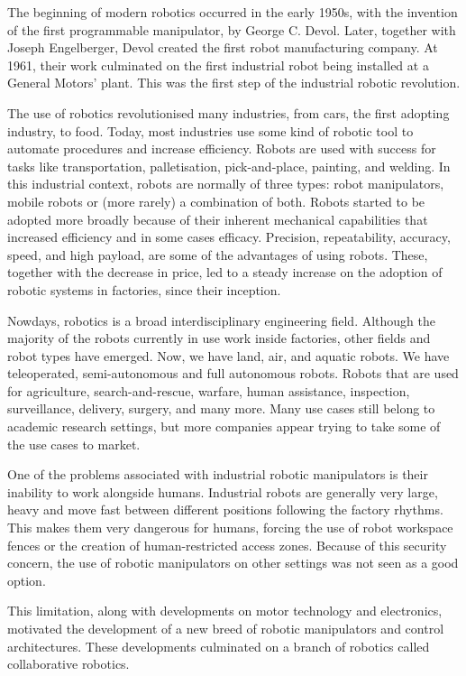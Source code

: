 The beginning of modern robotics occurred in the early 1950s, with the invention of the first programmable manipulator, by George C. Devol. Later, together with Joseph Engelberger, Devol created the first robot manufacturing company. At 1961, their work culminated on the first industrial robot being installed at a General Motors' plant. This was the first step of the industrial robotic revolution.

The use of robotics revolutionised many industries, from cars, the first adopting industry, to food. Today, most industries use some kind of robotic tool to automate procedures and increase efficiency. Robots are used with success for tasks like transportation, palletisation, pick-and-place, painting, and welding. In this industrial context, robots are normally of three types: robot manipulators, mobile robots or (more rarely) a combination of both. Robots started to be adopted more broadly because of their inherent mechanical capabilities that increased efficiency and in some cases efficacy. Precision, repeatability, accuracy, speed, and high payload, are some of the advantages of using robots. These, together with the decrease in price, led to a steady increase on the adoption of robotic systems in factories, since their inception.

Nowdays, robotics is a broad interdisciplinary engineering field. Although the majority of the robots currently in use work inside factories, other fields and robot types have emerged. Now, we have land, air, and aquatic robots. We have teleoperated, semi-autonomous and full autonomous robots. Robots that are used for agriculture, search-and-rescue, warfare, human assistance, inspection, surveillance, delivery, surgery, and many more. Many use cases still belong to academic research settings, but more companies appear trying to take some of the use cases to market.

One of the problems associated with industrial robotic manipulators is their inability to work alongside humans. Industrial robots are generally very large, heavy and move fast between different positions following the factory rhythms. This makes them very dangerous for humans, forcing the use of robot workspace fences or the creation of human-restricted access zones. Because of this security concern, the use of robotic manipulators on other settings was not seen as a good option.

This limitation, along with developments on motor technology and electronics, motivated the development of a new breed of robotic manipulators and control architectures. These developments culminated on a branch of robotics called collaborative robotics. 

